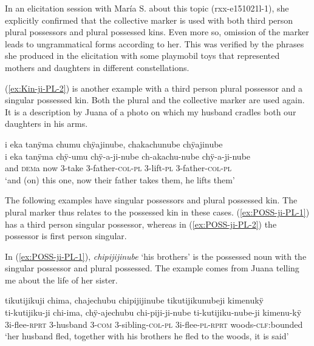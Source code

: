 In an elicitation session with María S. about this topic (rxx-e151021l-1), she explicitly confirmed that the collective marker is used with both third person plural possessors and plural possessed kins. Even more so, omission of the marker leads to ungrammatical forms according to her. This was verified by the phrases she produced in the elicitation with some playmobil toys that represented mothers and daughters in different constellations.

(\ref{ex:Kin-ji-PL-2}) is another example with a third person plural possessor and a singular possessed kin. Both the plural and the collective marker are used again. It is a description by Juana of a photo on which my husband cradles both our daughters in his arms. 

\ea\label{ex:Kin-ji-PL-2}
\begingl 
\glpreamble i eka tanÿma chumu chÿajinube, chakachunube chÿajinube\\
\gla i eka tanÿma chÿ-umu chÿ-a-ji-nube ch-akachu-nube chÿ-a-ji-nube\\ 
\glb and \textsc{dem}a now 3-take 3-father-\textsc{col}-\textsc{pl} 3-lift-\textsc{pl} 3-father-\textsc{col}-\textsc{pl}\\ 
\glft ‘and (on) this one, now their father takes them, he lifts them’\\ 
\endgl
\trailingcitation{[jxx-p141024s-1.26]}
\xe

The following examples have singular possessors and plural possessed kin. The plural marker thus relates to the possessed kin in these cases. (\ref{ex:POSS-ji-PL-1}) has a third person singular possessor, whereas in (\ref{ex:POSS-ji-PL-2}) the possessor is first person singular.

In (\ref{ex:POSS-ji-PL-1}), \textit{chipijijinube} ‘his brothers’ is the possessed noun with the singular possessor and plural possessed. The example comes from Juana telling me about the life of her sister.

\ea\label{ex:POSS-ji-PL-1}
\begingl
\glpreamble tikutijikuji chima, chajechubu chipijijinube tikutijikunubeji kimenukÿ \\
\gla ti-kutijiku-ji chi-ima, chÿ-ajechubu chi-piji-ji-nube ti-kutijiku-nube-ji kimenu-kÿ \\
\glb 3i-flee-\textsc{rprt} 3-husband 3-\textsc{com} 3-sibling-\textsc{col}-\textsc{pl} 3i-flee-\textsc{pl}-\textsc{rprt} woods-\textsc{clf:}bounded\\
\glft  ‘her husband fled, together with his brothers he fled to the woods, it is said’
\endgl
\trailingcitation{[jxx-p120430l-2.086-087]}
\xe

